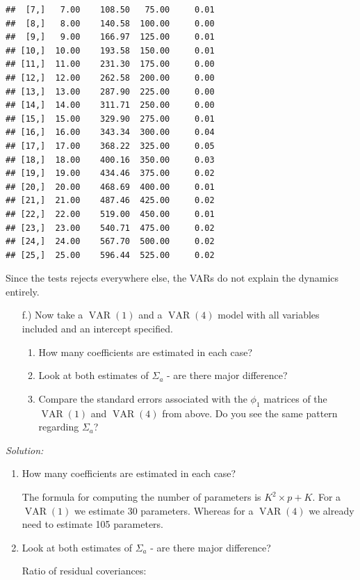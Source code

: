 \documentclass[12pt,a4paper]{article}
\newcommand{\VAR}{\operatorname{VAR}} %
\begin{document}
\begin{verbatim}
##  [7,]   7.00    108.50   75.00     0.01
##  [8,]   8.00    140.58  100.00     0.00
##  [9,]   9.00    166.97  125.00     0.01
## [10,]  10.00    193.58  150.00     0.01
## [11,]  11.00    231.30  175.00     0.00
## [12,]  12.00    262.58  200.00     0.00
## [13,]  13.00    287.90  225.00     0.00
## [14,]  14.00    311.71  250.00     0.00
## [15,]  15.00    329.90  275.00     0.01
## [16,]  16.00    343.34  300.00     0.04
## [17,]  17.00    368.22  325.00     0.05
## [18,]  18.00    400.16  350.00     0.03
## [19,]  19.00    434.46  375.00     0.02
## [20,]  20.00    468.69  400.00     0.01
## [21,]  21.00    487.46  425.00     0.02
## [22,]  22.00    519.00  450.00     0.01
## [23,]  23.00    540.71  475.00     0.02
## [24,]  24.00    567.70  500.00     0.02
## [25,]  25.00    596.44  525.00     0.02
\end{verbatim}

Since the tests rejects everywhere else, the VARs do not explain the
dynamics entirely.

\begin{itemize}
  \item[f.)] Now take a $\VAR(1)$ and a $\VAR(4)$ model with all variables included and an intercept specified.
  \begin{enumerate}[label=(\roman*)]
    \item How many coefficients are estimated in each case?
    \item Look at both estimates of $\Sigma_a$ - are there major difference?
    \item Compare the standard errors associated with the $\phi_1$ matrices of the $\VAR(1)$ and $\VAR(4)$ from above. Do you see the same pattern regarding $\Sigma_a$? 
  \end{enumerate}
\end{itemize}

\emph{Solution:}

\begin{enumerate}[label=(\roman*)]
    \item How many coefficients are estimated in each case?
    
    The formula for computing the number of parameters is $K^2 \times p + K$. For a $\VAR(1)$ we estimate 30 parameters. Whereas for a $\VAR(4)$ we already need to estimate  105 parameters. 
    
    \item Look at both estimates of $\Sigma_a$ - are there major difference?

    Ratio of residual coveriances: 
  \end{enumerate}
\end{document}
